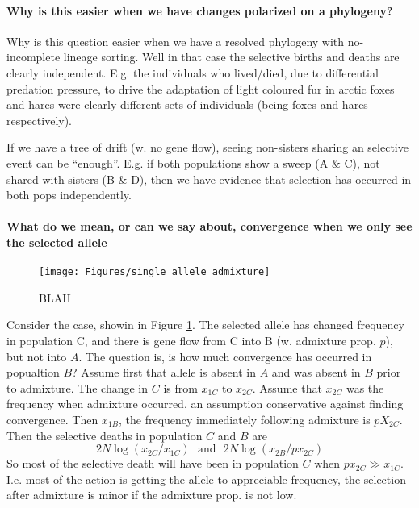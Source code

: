 \documentclass[a4paper,10pt]{article}
\begin{document}
\paragraph{Why is this easier when we have changes polarized on a phylogeny?}

Why is this question easier when we have a resolved phylogeny with
no-incomplete lineage sorting.
Well in that case the selective births and deaths are clearly
independent. E.g. the individuals who lived/died, due to differential
predation pressure, to drive the adaptation of light coloured fur in
arctic foxes and hares were clearly different sets of individuals
(being foxes and hares respectively). 


If we have a tree of drift (w. no gene flow), seeing non-sisters sharing an selective
event can be ``enough''. E.g. if both populations show a sweep (A \& C), not
shared with sisters (B \& D), then we have evidence that selection has occurred
in both pops independently. 

\paragraph{What do we mean, or can we say about, convergence when we only see the selected allele}


\begin{figure}
	\texttt{[image: Figures/single\_allele\_admixture]}
	\caption{BLAH}
	\label{fig:admix-graph}
\end{figure}
Consider the case, showin in Figure \ref{fig:admix-graph}. The selected allele has changed frequency in
population C, and there is gene flow from C into B (w. admixture
prop. $p$), but not into $A$. The question is, is how much convergence
has occurred in popualtion $B$?  
Assume first that allele is absent in
$A$ and was absent in $B$ prior to admixture.  The change in $C$ is
from $x_{1C}$ to $x_{2C}$. Assume that
$x_{2C}$ was the frequency when admixture occurred, an assumption conservative
against finding convergence. Then $x_{1B}$, the frequency immediately
following admixture is $pX_{2C}$. Then the selective deaths in
population $C$ and $B$ are
\begin{equation} 
2N\log(x_{2C}/x_{1C})~~~\textrm{and}~~~2N\log(x_{2B}/px_{2C})
\end{equation}
So most of the selective death will have been in population $C$ when
$px_{2C} \gg x_{1C}$. I.e. most of the action is getting the allele to
appreciable frequency, the selection after admixture is minor if the
admixture prop. is not low.\\ 
\end{document}
